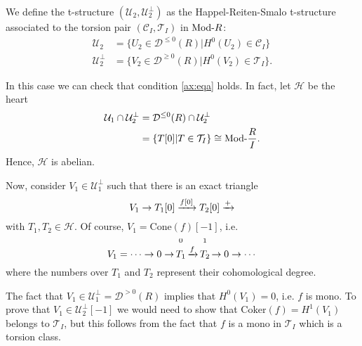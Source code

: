 We define the t-structure $(\mathcal{U}_2,\mathcal{U}_2^\perp)$ as the Happel-Reiten-Smalo t-structure
associated to the torsion pair $(\mathcal{C}_I,\mathcal{T}_I)$ in $\mathrm{\textup{Mod-}}R$:
\begin{align*}
  \mathcal{U}_2 &= \{ U_2\in\mathcal{D}^{\leq 0}(R) | H^0(U_2)\in\mathcal{C}_I \} \\
  \mathcal{U}_2^\perp &= \{ V_2\in\mathcal{D}^{\geq 0}(R) | H^0(V_2)\in\mathcal{T}_I \}.
\end{align*}

In this case we can check that condition \cref{ax:eqa} holds. In fact, let $\mathcal{H}$ be the heart
\begin{align*}
  \mathcal{U}_1\cap\mathcal{U}_2^\perp &= \mathcal{D}^{\leq 0}(R)\cap \mathcal{U}_2^\perp \\
  &= \{ T[0] | T\in\mathcal{T}_I \} \cong \mathrm{\textup{Mod-}}\frac{R}{I}.
\end{align*}
Hence, $\mathcal{H}$ is abelian.

Now, consider $V_1\in\mathcal{U}_1^\perp$ such that there is an exact triangle
\begin{equation*}
  V_1\to T_1[0]\xrightarrow{f[0]}T_2[0]\xrightarrow{+}
\end{equation*}
with $T_1,T_2\in\mathcal{H}$. Of course, $V_1 = \mathrm{Cone}(f)[-1]$, i.e.
\begin{equation*}
  V_1 = \cdots \to0\to\,\oset[2ex]{\small 0}{T_1}\,\nto{f}\,\oset[2ex]{\small 1}{T_2}\,\to 0\to \cdots
\end{equation*}
where the numbers over $T_1$ and $T_2$ represent their cohomological degree.

The fact that $V_1\in\mathcal{U}_1^\perp = \mathcal{D}^{> 0}(R)$ implies that $H^0(V_1)=0$, i.e. $f$ is mono.
To prove that $V_1\in\mathcal{U}_2^\perp[-1]$ we would need to show that $\mathrm{Coker}(f)=H^1(V_1)$ belongs to $\mathcal{T}_I$,
but this follows from the fact that $f$ is a mono in $\mathcal{T}_I$ which is a torsion class.
